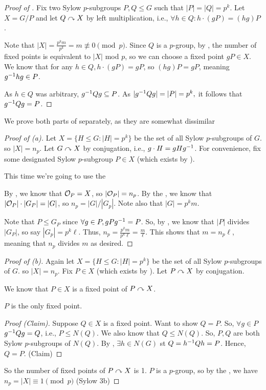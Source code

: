 \documentclass[notes.tex]{subfiles}
\begin{document}
\begin{proof}[Proof of ]
	Fix two Sylow $p$-subgroups $P, Q\le G$ such that $|P| = |Q| = p^k$.
	Let $X = G/P$ and let $Q\curvearrowright X$ by left multiplication, i.e., $\forall h\in Q: h\cdot (gP) = (hg)P$.

	Note that $|X| = \frac{p^km}{p^k} = m \not\equiv 0\pmod p$.
	Since $Q$ is a $p$-group, by , the number of fixed points is equivalent to $|X|$ mod $p$, so we can choose a fixed point $gP\in X$. We know that for any $h\in Q, h\cdot(gP) = gP$, so $(hg)P = gP$, meaning ${g}^{-1}hg\in P$.

	As $h\in Q$ was arbitrary, ${g}^{-1}Qg\subseteq P$. As $|{g}^{-1}Qg| = |P| = p^k,$ it follows that ${g}^{-1}Qg=P$.
\end{proof}

We prove both parts of  separately, as they are somewhat dissimilar
\begin{proof}[Proof of  (a)]
	Let $X = \{H\le G : |H| = p^k\}$ be the set of all Sylow $p$-subgroups of $G$. so $|X| = n_p$.
	Let $G\curvearrowright X$ by conjugation, i.e., $g\cdot H = gH{g}^{-1}$.
	For convenience, fix some designated Sylow $p$-subgroup $P\in X$ (which exists by ).

	This time we're going to use the 

	By , we know that $\mathcal{O}_P = X$, so $|\mathcal{O}_P| = n_p$. By the , we know that $|\mathcal{O}_P|\cdot|G_P| = |G|$, so $n_p = |G|/|G_p|$. Note also that $|G| = p^km$.

	Note that $P\le G_P$ since $\forall g\in P, gP{g}^{-1} = P$.
	So, by ,
	we know that $|P|$ divides $|G_P|$, so say $|G_p| = p^k\ell.$ Thus, $n_p = \frac{p^km}{p^k\ell} = \frac{m}{\ell}$. This shows that $m = n_p\ell$, meaning that $n_p$ divides $m$ as desired.
\end{proof}

\begin{proof}[Proof of  (b)]
	Again let $X = \{H\le G : |H| = p^k\}$ be the set of all Sylow $p$-subgroups of $G$. so $|X| = n_p$.
	Fix $P\in X$ (which exists by ).
	Let $P\curvearrowright X$ by conjugation.

	We know that $P\in X$ is a fixed point of $P\curvearrowright X$.

	\begin{claim}
		$P$ is the only fixed point.
	\end{claim}
	\begin{proof}[Proof (Claim)]
		Suppose $Q\in X$ is a fixed point. Want to show $Q = P$.
		So, $\forall g\in P$ ${g}^{-1}Qg = Q$, i.e., $P \le N(Q)$.
		We also know that $Q\le N(Q)$. So, $P, Q$ are both Sylow $p$-subgroups of $N(Q)$. By , $\exists h\in N(G)$ st
		$Q = {h}^{-1}Qh = P$. Hence, $Q=P$.
		\qedhere(Claim)
	\end{proof}

	So the number of fixed points of $P\curvearrowright X$ is 1. $P$ is a $p$-group, so by the , we have $n_p = |X| \equiv 1\pmod p$
	\qedhere(Sylow 3b)
\end{proof}
\end{document}
